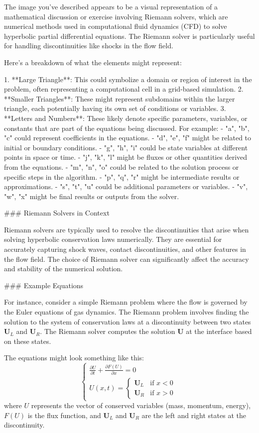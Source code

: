 The image you've described appears to be a visual representation of a mathematical discussion or exercise involving Riemann solvers, which are numerical methods used in computational fluid dynamics (CFD) to solve hyperbolic partial differential equations. The Riemann solver is particularly useful for handling discontinuities like shocks in the flow field.

Here's a breakdown of what the elements might represent:

1. **Large Triangle**: This could symbolize a domain or region of interest in the problem, often representing a computational cell in a grid-based simulation.
2. **Smaller Triangles**: These might represent subdomains within the larger triangle, each potentially having its own set of conditions or variables.
3. **Letters and Numbers**: These likely denote specific parameters, variables, or constants that are part of the equations being discussed. For example:
   - "a", "b", "c" could represent coefficients in the equations.
   - "d", "e", "f" might be related to initial or boundary conditions.
   - "g", "h", "i" could be state variables at different points in space or time.
   - "j", "k", "l" might be fluxes or other quantities derived from the equations.
   - "m", "n", "o" could be related to the solution process or specific steps in the algorithm.
   - "p", "q", "r" might be intermediate results or approximations.
   - "s", "t", "u" could be additional parameters or variables.
   - "v", "w", "x" might be final results or outputs from the solver.

### Riemann Solvers in Context

Riemann solvers are typically used to resolve the discontinuities that arise when solving hyperbolic conservation laws numerically. They are essential for accurately capturing shock waves, contact discontinuities, and other features in the flow field. The choice of Riemann solver can significantly affect the accuracy and stability of the numerical solution.

### Example Equations

For instance, consider a simple Riemann problem where the flow is governed by the Euler equations of gas dynamics. The Riemann problem involves finding the solution to the system of conservation laws at a discontinuity between two states \( \mathbf{U}_L \) and \( \mathbf{U}_R \). The Riemann solver computes the solution \( \mathbf{U} \) at the interface based on these states.

The equations might look something like this:
\[
\begin{cases}
\frac{\partial U}{\partial t} + \frac{\partial F(U)}{\partial x} = 0 \\
U(x,t) = 
\begin{cases}
\mathbf{U}_L & \text{if } x < 0 \\
\mathbf{U}_R & \text{if } x > 0
\end{cases}
\end{cases}
\]
where \( U \) represents the vector of conserved variables (mass, momentum, energy), \( F(U) \) is the flux function, and \( \mathbf{U}_L \) and \( \mathbf{U}_R \) are the left and right states at the discontinuity.

